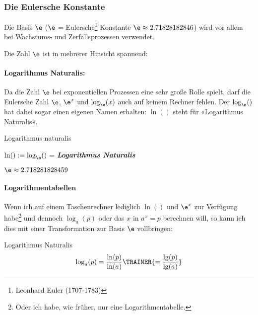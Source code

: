 \newpage


\subsubsection{Die Eulersche Konstante}

Die Basis $\e$ ($\e$ = Eulersche\footnote{Leonhard Euler (1707-1783)} Konstante $\e\approx 2.71828182846$) wird vor allem bei Wachstums- und Zerfallsprozessen verwendet.

Die Zahl $\e$ ist in mehrerer Hinsicht spannend:

\paragraph{Logarithmus Naturalis:} Da die
Zahl $\e$ bei exponentiellen Prozessen eine sehr große Rolle spielt,
darf die Eulersche Zahl $\e$, $\e^x$ und $\log_{\e}(x)$ auch auf keinem Rechner fehlen. Der $\log_{\e}()$ hat dabei sogar einen eigenen Namen erhalten:
$\ln()$ steht für «Logarithmus Naturalis».

\begin{definition}{Logarithmus naturalis}{}
  
  $\ln() := \log_{\e}()$ = \textit{\textbf{Logarithmus Naturalis}}

  $\e\approx 2.718281828459$
\end{definition}

\paragraph{Logarithmentabellen}
Wenn ich auf einem Taschenrechner lediglich $\ln()$ und $\e^x$ zur
Verfügung habe\footnote{Oder ich habe, wie früher, nur eine
Logarithmentabelle.} und dennoch $\log_a(p)$ oder das $x$ in $a^x=p$ berechnen will, so kann ich dies mit einer Transformation zur Basis $\e$ vollbringen:

\begin{gesetz}{Logarithmus Naturalis}{}
  $$\log_a(p) = \frac{\ln(p)}{\ln(a)} \TRAINER{= \frac{\lg(p)}{\lg(a)}}$$
\end{gesetz}


\newpage

